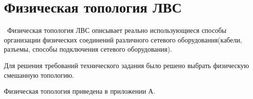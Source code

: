 \documentclass[russian,utf8,pointsection,simple,14pt]{eskdtext}
\begin{document}
	\maketitle
	\newpage
	\tableofcontents
	\newpage
	\section{Физическая топология ЛВС}
	\
	Физическая топология ЛВС описывает реально использующиеся способы организации физических соединений различного сетевого оборудования(кабели, разъемы, способы подключения сетевого оборудования).
	
	Для решения требований технического задания было решено выбрать физическую смешанную топологию.
	
	Физическая топология приведена в приложении А.
\end{document}
